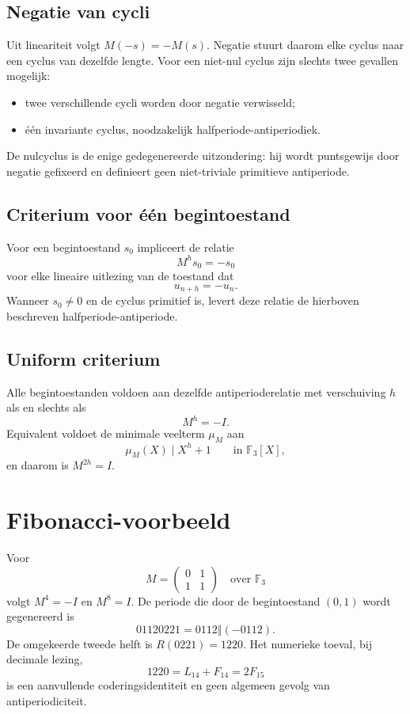 \documentclass[11pt,a4paper]{article}
\newcommand{\F}{\mathbb{F}}
\newcommand{\oplusword}{\mathbin{\Vert}}
\begin{document}
\subsection{Negatie van cycli}
Uit lineariteit volgt $M(-s)=-M(s)$. Negatie stuurt daarom elke cyclus naar een cyclus van dezelfde lengte. Voor een niet-nul cyclus zijn slechts twee gevallen mogelijk:
\begin{itemize}
\item twee verschillende cycli worden door negatie verwisseld;
\item één invariante cyclus, noodzakelijk halfperiode-antiperiodiek.
\end{itemize}
De nulcyclus is de enige gedegenereerde uitzondering: hij wordt puntsgewijs door negatie gefixeerd en definieert geen niet-triviale primitieve antiperiode.

\subsection{Criterium voor één begintoestand}
Voor een begintoestand $s_0$ impliceert de relatie
\[
M^hs_0=-s_0
\]
voor elke lineaire uitlezing van de toestand dat
\[
u_{n+h}=-u_n.
\]
Wanneer $s_0\neq0$ en de cyclus primitief is, levert deze relatie de hierboven beschreven halfperiode-antiperiode.

\clearpage
\subsection{Uniform criterium}
Alle begintoestanden voldoen aan dezelfde antiperioderelatie met verschuiving $h$ als en slechts als
\[
M^h=-I.
\]
Equivalent voldoet de minimale veelterm $\mu_M$ aan
\[
\mu_M(X)\mid X^h+1\qquad\text{in }\F_3[X],
\]
en daarom is $M^{2h}=I$.

\section{Fibonacci-voorbeeld}
Voor
\[
M=\begin{pmatrix}0&1\\1&1\end{pmatrix}\quad\text{over }\F_3
\]
volgt $M^4=-I$ en $M^8=I$. De periode die door de begintoestand $(0,1)$ wordt gegenereerd is
\[
01120221=0112\oplusword(-0112).
\]
De omgekeerde tweede helft is $R(0221)=1220$. Het numerieke toeval, bij decimale lezing,
\[
1220=L_{14}+F_{14}=2F_{15}
\]
is een aanvullende coderingsidentiteit en geen algemeen gevolg van antiperiodiciteit.
\end{document}
